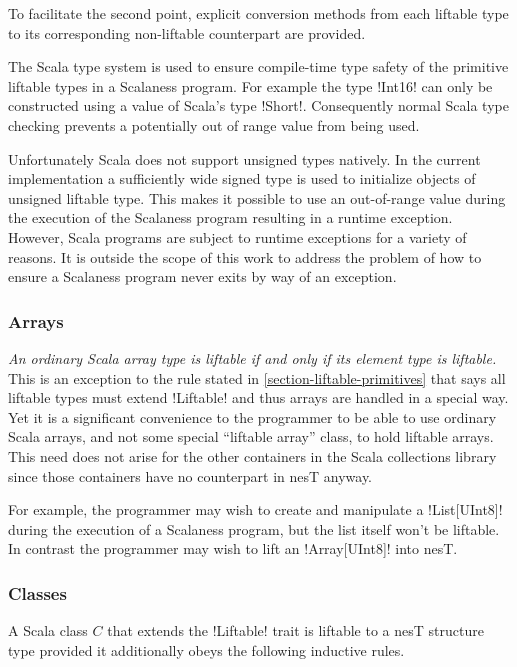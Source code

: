 To facilitate the second point, explicit conversion methods from each liftable type to its
corresponding non-liftable counterpart are provided.

The Scala type system is used to ensure compile-time type safety of the primitive liftable types
in a Scalaness program. For example the type !Int16! can only be constructed using a value of
Scala's type !Short!. Consequently normal Scala type checking prevents a potentially out of
range value from being used.

Unfortunately Scala does not support unsigned types natively. In the current implementation a
sufficiently wide signed type is used to initialize objects of unsigned liftable type. This
makes it possible to use an out-of-range value during the execution of the Scalaness program
resulting in a runtime exception. However, Scala programs are subject to runtime exceptions for
a variety of reasons. It is outside the scope of this work to address the problem of how to
ensure a Scalaness program never exits by way of an exception.

\subsubsection{Arrays}
\label{section-liftable-arrays}

\emph{An ordinary Scala array type is liftable if and only if its element type is liftable.}
This is an exception to the rule stated in \autoref{section-liftable-primitives} that says all
liftable types must extend !Liftable! and thus arrays are handled in a special way. Yet it is a
significant convenience to the programmer to be able to use ordinary Scala arrays, and not some
special ``liftable array'' class, to hold liftable arrays. This need does not arise for the
other containers in the Scala collections library since those containers have no counterpart in
nesT anyway.

For example, the programmer may wish to create and manipulate a !List[UInt8]! during the
execution of a Scalaness program, but the list itself won't be liftable. In contrast the
programmer may wish to lift an !Array[UInt8]! into nesT.

\subsubsection{Classes}
\label{section-liftable-classes}

A Scala class $C$ that extends the !Liftable! trait is liftable to a nesT structure type
provided it additionally obeys the following inductive rules.

